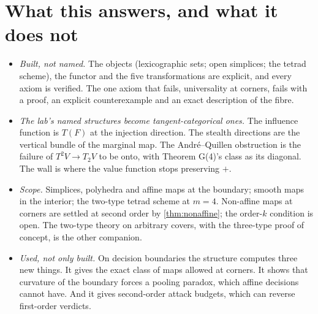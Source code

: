 \documentclass[11pt]{article}
\theoremstyle{definition}\newtheorem{definition}[theorem]{Definition}\newtheorem{remark}[theorem]{Remark}\newtheorem{example}[theorem]{Example}
\begin{document}
\section{What this answers, and what it does not}\label{sec:answers}
\begin{itemize}
\item \emph{Built, not named.} The objects (lexicographic sets; open simplices; the tetrad scheme), the functor and the five
  transformations are explicit, and every axiom is verified. The one axiom that fails, universality at corners, fails with a proof, an
  explicit counterexample and an exact description of the fibre.
\item \emph{The lab's named structures become tangent-categorical ones.} The influence function is $T(F)$ at the injection direction.
  The stealth directions are the vertical bundle of the marginal map. The André--Quillen obstruction is the failure of $T^2V\to T_2V$ to
  be onto, with Theorem G(4)'s class as its diagonal. The wall is where the value function stops preserving $+$.
\item \emph{Scope.} Simplices, polyhedra and affine maps at the boundary; smooth maps in the interior; the two-type tetrad scheme at
  $m=4$. Non-affine maps at corners are settled at second order by \cref{thm:nonaffine}; the order-$k$ condition is open. The two-type
  theory on arbitrary covers, with the three-type proof of concept, is the other companion.
\item \emph{Used, not only built.} On decision boundaries the structure computes three new things. It gives the exact class of maps
  allowed at corners. It shows that curvature of the boundary forces a pooling paradox, which affine decisions cannot have. And it gives
  second-order attack budgets, which can reverse first-order verdicts.
\end{itemize}
\end{document}
